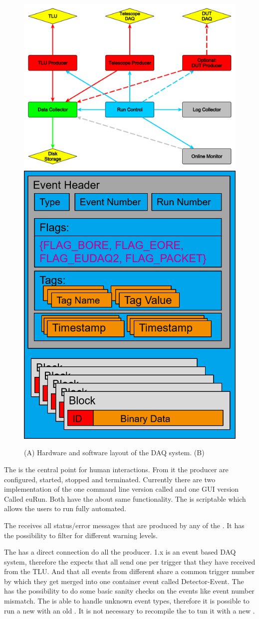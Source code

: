 \begin{figure}[tb]
	\center
	\includegraphics[width=.55\textwidth]{figures/eudaq}
	\includegraphics[width=.38\textwidth]{figures/rawdataevent.png}
	\caption[DAQ_System]{(A) Hardware and software layout of the DAQ system. (B) \rawdataevent}
	\label{fig:todo}
\end{figure}

% 	


The \rc is the central point for human interactions. 
From it the producer are configured, started, stopped and terminated. 
Currently there are two implementation of the \rc one command line version called \testrc and one GUI version Called euRun. 
Both have the about same functionality. The \testrc is scriptable which allows the users to run fully automated. 

The \logcollector receives all status/error messages that are produced by any of the \producer. 
It has the possibility to filter for different warning levels. 

The \dc has a direct connection do all the producer. 
\eudaq 1.x is an event based DAQ system, therefore the \dc expects that all \producer send one \event per trigger that they have received from the TLU. And that all events from different \producer share a common trigger number by which they get merged into one container event called Detector-Event. 
The \dc has the possibility to do some basic sanity checks on the events like event number mismatch. The \dc is able to handle unknown event types, therefore it is possible to run a new \producer with an old \dc. It is not necessary to recompile the \dc to tun it with a new \producer. 

